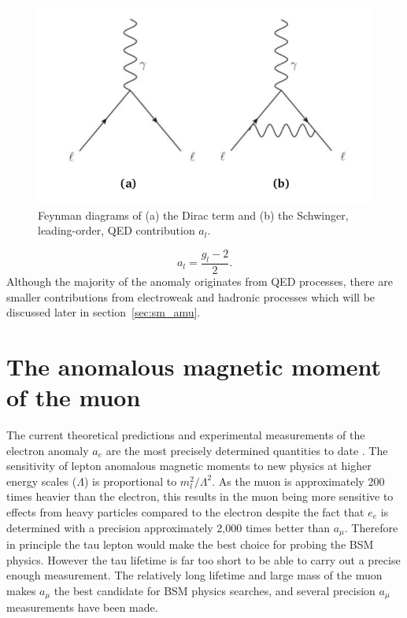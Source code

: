 \begin{figure}[th]
\centering
\includegraphics[scale=0.7]{Figures/dirac_g}
\decoRule
\caption{Feynman diagrams of (a) the Dirac term and (b) the Schwinger, leading-order, QED contribution $a_{l}$.}
\label{fig:dirac_g}
\end{figure}

\begin{equation}
a_{l} = \frac{g_{l}-2}{2}.
\end{equation}
Although the majority of the anomaly originates from QED processes, there are smaller contributions from electroweak and hadronic processes which will be discussed later in section~\ref{sec:sm_amu}.

\section{The anomalous magnetic moment of the muon}
\label{sec:amm}

The current theoretical predictions and experimental measurements of the electron anomaly $a_{e}$ are the most precisely determined quantities to date \cite{Reference8}. The sensitivity of lepton anomalous magnetic moments to new physics at higher energy scales ($\Lambda$) is proportional to  $m_{l}^2/\Lambda^2$. As the muon is approximately 200 times heavier than the electron, this results in the muon being more sensitive to effects from heavy particles compared to the electron despite the fact that $e_e$ is determined with a precision approximately 2,000 times better than $a_\mu$. Therefore in principle the tau lepton would make the best choice for probing the BSM physics. However the tau lifetime is far too short to be able to carry out a precise enough measurement. The relatively long lifetime and large mass of the muon makes $a_{\mu}$ the best candidate for BSM physics searches, and several precision $a_{\mu}$ measurements have been made. 

